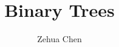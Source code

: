 \documentclass[12pt, letterpaper]{article}
\title{Binary Trees}
\author{Zehua Chen}
\theoremstyle{theorem}
\begin{document}
  \maketitle
  \tableofcontents

  \setmainstyles

  
  
  
  
\end{document}
